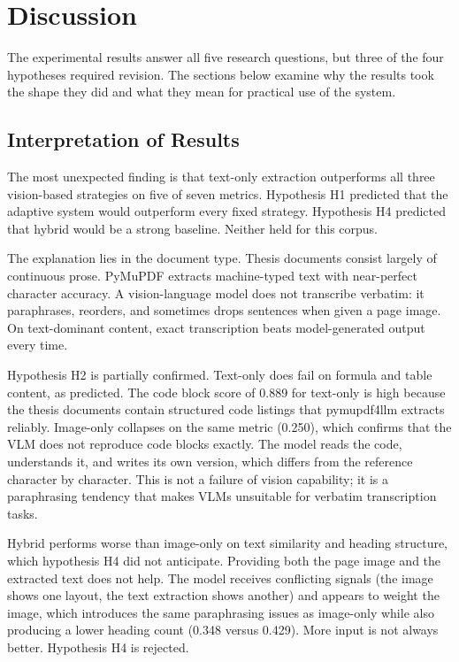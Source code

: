 \chapter{Discussion}

The experimental results answer all five research questions, but three of the
four hypotheses required revision. The sections below examine why the results
took the shape they did and what they mean for practical use of the system.

\section{Interpretation of Results}

The most unexpected finding is that text-only extraction outperforms
all three vision-based strategies on five of seven metrics.
Hypothesis H1 predicted that the adaptive system would outperform every
fixed strategy. Hypothesis H4 predicted that hybrid would be a strong
baseline. Neither held for this corpus.

The explanation lies in the document type. Thesis documents consist
largely of continuous prose. PyMuPDF extracts machine-typed text with
near-perfect character accuracy. A vision-language model does not
transcribe verbatim: it paraphrases, reorders, and sometimes drops
sentences when given a page image. On text-dominant content, exact
transcription beats model-generated output every time.

Hypothesis H2 is partially confirmed. Text-only does fail on formula
and table content, as predicted. The code block score of 0.889 for
text-only is high because the thesis documents contain structured code
listings that pymupdf4llm extracts reliably. Image-only collapses on
the same metric (0.250), which confirms that the VLM does not reproduce
code blocks exactly. The model reads the code, understands it, and
writes its own version, which differs from the reference character by
character. This is not a failure of vision capability; it is a
paraphrasing tendency that makes VLMs unsuitable for verbatim
transcription tasks.

Hybrid performs worse than image-only on text similarity and heading
structure, which hypothesis H4 did not anticipate. Providing both the
page image and the extracted text does not help. The model receives
conflicting signals (the image shows one layout, the text extraction
shows another) and appears to weight the image, which introduces the
same paraphrasing issues as image-only while also producing a lower
heading count (0.348 versus 0.429). More input is not always better.
Hypothesis H4 is rejected.

